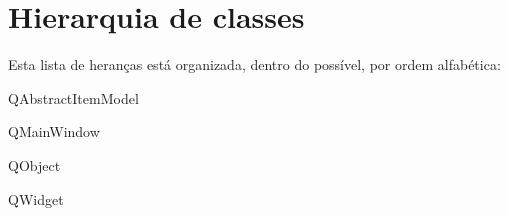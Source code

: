 \section{Hierarquia de classes}
Esta lista de heranças está organizada, dentro do possível, por ordem alfabética\-:\begin{DoxyCompactList}
\item Q\-Abstract\-Item\-Model\begin{DoxyCompactList}
\item {}
\end{DoxyCompactList}
\item Q\-Main\-Window\begin{DoxyCompactList}
\item {}
\end{DoxyCompactList}
\item Q\-Object\begin{DoxyCompactList}
\item {}
\item {}
\end{DoxyCompactList}
\item Q\-Widget\begin{DoxyCompactList}
\item {}
\begin{DoxyCompactList}
\item {}
\end{DoxyCompactList}
\item {}
\begin{DoxyCompactList}
\item {}
\end{DoxyCompactList}
\item {}
\begin{DoxyCompactList}
\item {}
\end{DoxyCompactList}
\end{DoxyCompactList}
\end{DoxyCompactList}
